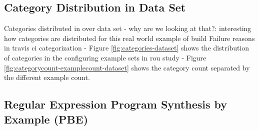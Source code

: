 \documentclass[\myrootdir/main.tex]{subfiles}
\begin{document}
\subsection{Category Distribution in Data Set}
Categories distributed in over data set
- why are we looking at that?: interesting how categories are distributed for this real world example of build Failure reasons in travis ci categorization
- Figure \ref{fig:categories-dataset} shows the distribution of categories in the configuring example sets in rou study
- Figure \ref{fig:categorycount-examplecount-dataset} shows the category count separated by the different example count.


\subsection{Regular Expression Program Synthesis by Example (PBE)}
\end{document}
